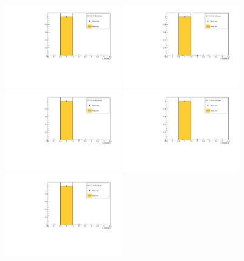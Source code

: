 \begin{figure}[!tbh]
    \centering
    \includegraphics*[width=0.45\textwidth]{02-Cuts/Figures/2017-2.7_3-140_lH2_full/tkd_n_tracks_ds_cut.pdf}
    \includegraphics*[width=0.45\textwidth]{02-Cuts/Figures/2017-2.7_3-140_lH2_empty/tkd_n_tracks_ds_cut.pdf}
    \includegraphics*[width=0.45\textwidth]{02-Cuts/Figures/2017-2.7_6-140_lH2_full/tkd_n_tracks_ds_cut.pdf}
    \includegraphics*[width=0.45\textwidth]{02-Cuts/Figures/2017-2.7_6-140_lH2_empty/tkd_n_tracks_ds_cut.pdf}
    \includegraphics*[width=0.45\textwidth]{02-Cuts/Figures/2017-2.7_10-140_lH2_full/tkd_n_tracks_ds_cut.pdf}

\end{figure}

